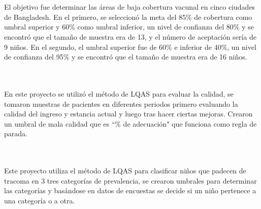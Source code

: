 ~\\\textbf{\citet{AE2}}
~\\El objetivo fue determinar las \'{a}reas de baja cobertura vacunal en cinco ciudades de Bangladesh. En el primero, se seleccion\'{o} la meta del 85\% de cobertura como umbral superior y 60\% como umbral inferior, un nivel de confianza del 80\% y se encontr\'{o} que el tama\~{n}o de muestra era de 13, y el n\'{u}mero de aceptaci\'{o}n ser\'{i}a de 9 ni\~{n}os. En el segundo, el umbral superior fue de 60\% e inferior de 40\%, un nivel de confianza del 95\% y se encontr\'{o} que el tama\~{n}o de muestra era de 16 ni\~{n}os.

~\\\textbf{\citet{AE3}}
~\\En este proyecto se utiliz\'{o} el m\'{e}todo de LQAS para evaluar la calidad, se tomaron muestras de pacientes en diferentes periodos primero evaluando la calidad del ingreso y estancia actual y luego tras hacer ciertas mejoras. Crearon un umbral de mala calidad que es ``\% de adecuaci\'{o}n" que funciona como regla de parada.

~\\\textbf{\citet{AE4}}
~\\Este proyecto utiliza el m\'{e}todo de LQAS para clasificar ni\~{n}os que padecen de tracoma en 3 tres categor\'{i}as de prevalencia, se crearon umbrales para determinar las categor\'{i}as y bas\'{a}ndose en datos de encuestas se decide si un ni\~{n}o pertenece a una categor\'{i}a o a otra.